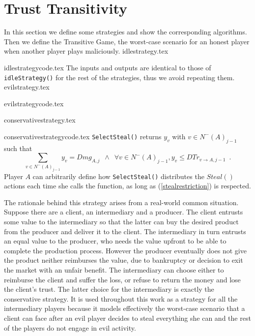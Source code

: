 \section{Trust Transitivity}
  In this section we define some strategies and show the corresponding algorithms. Then we define the Transitive Game, the
  worst-case scenario for an honest player when another player plays maliciously.
  {idlestrategy.tex}

  {idlestrategycode.tex}
  The inputs and outputs are identical to those of \texttt{idleStrategy()} for the rest of the strategies, thus we avoid
  repeating them.
  {evilstrategy.tex}

  {evilstrategycode.tex}

  {conservativestrategy.tex}

  {conservativestrategycode.tex}
  \texttt{SelectSteal()} returns $y_v$ with $v \in N^{-}\left(A\right)_{j-1}$ such that
  \begin{equation}
  \label{stealrestriction}
     \sum\limits_{v \in N^{-}\left(A\right)_{j-1}}y_v = Dmg_{A, j} \enspace \wedge \enspace \forall v \in N^{-}\left(A\right)_{j-1},
     y_v \leq DTr_{v \rightarrow A, j-1} \enspace.
  \end{equation}
  Player $A$ can arbitrarily define how \texttt{SelectSteal()} distributes the $Steal\left(\right)$ actions
  each time she calls the function, as long as (\ref{stealrestriction}) is respected.

  The rationale behind this strategy arises from a real-world common situation. Suppose there are a client, an
  intermediary and a producer. The client entrusts some value to the intermediary so that the latter can buy the desired
  product from the producer and deliver it to the client. The intermediary in turn entrusts an equal value to the
  producer, who needs the value upfront to be able to complete the production process. However the producer eventually
  does not give the product neither reimburses the value, due to bankruptcy or decision to exit the market with an unfair
  benefit. The intermediary can choose either to reimburse the client and suffer the loss, or refuse to return the money
  and lose the client's trust. The latter choice for the intermediary is exactly the conservative strategy. It is used
  throughout this work as a strategy for all the intermediary players because it models effectively the worst-case
  scenario that a client can face after an evil player decides to steal everything she can and the rest of the players do
  not engage in evil activity.

